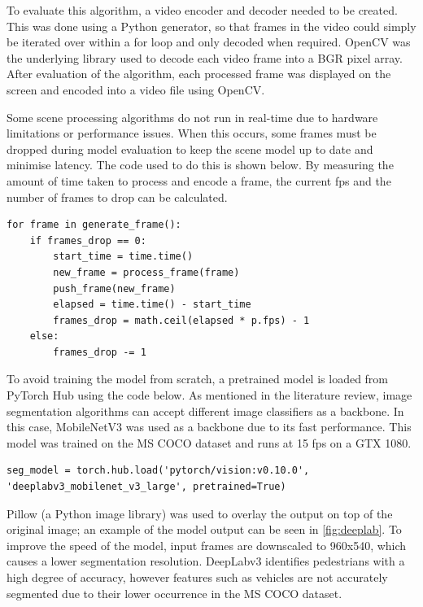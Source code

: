 \documentclass[12pt]{article}
\begin{document}
To evaluate this algorithm, a video encoder and decoder needed to be created. This was done using a Python generator,
so that frames in the video could simply be iterated over within a for loop and only decoded when required.
OpenCV \cite{bradskiOpenCVLibrary2000} was the underlying library used to decode each video frame into a BGR pixel array.
After evaluation of the algorithm, each processed frame was displayed on the screen and encoded into a video file using OpenCV.

Some scene processing algorithms do not run in real-time due to hardware limitations or performance issues.
When this occurs, some frames must be dropped during model evaluation to keep the scene model up to date and minimise latency.
The code used to do this is shown below. By measuring the amount of time taken to process and encode a frame, the current fps
and the number of frames to drop can be calculated.

\begin{verbatim}
for frame in generate_frame():
    if frames_drop == 0:
        start_time = time.time()
        new_frame = process_frame(frame)
        push_frame(new_frame)
        elapsed = time.time() - start_time
        frames_drop = math.ceil(elapsed * p.fps) - 1
    else:
        frames_drop -= 1
\end{verbatim}

To avoid training the model from scratch, a pretrained model is loaded from PyTorch Hub using the code below.
As mentioned in the literature review, image segmentation algorithms can accept different image classifiers as a backbone.
In this case, MobileNetV3 \cite{howardSearchingMobileNetV32019} was used as a backbone due to its fast performance.
This model was trained on the MS COCO \cite{linMicrosoftCOCOCommon2014} dataset and runs at 15 fps on a GTX 1080.

\begin{verbatim}
seg_model = torch.hub.load('pytorch/vision:v0.10.0', 'deeplabv3_mobilenet_v3_large', pretrained=True)
\end{verbatim}

Pillow (a Python image library) was used to overlay the output on top of the original image;
an example of the model output can be seen in \cref{fig:deeplab}. To improve the speed of the model, input frames are
downscaled to 960x540, which causes a lower segmentation resolution.
DeepLabv3 identifies pedestrians with a high degree of accuracy, however
features such as vehicles are not accurately segmented due to their lower occurrence in the MS COCO dataset.
\end{document}
